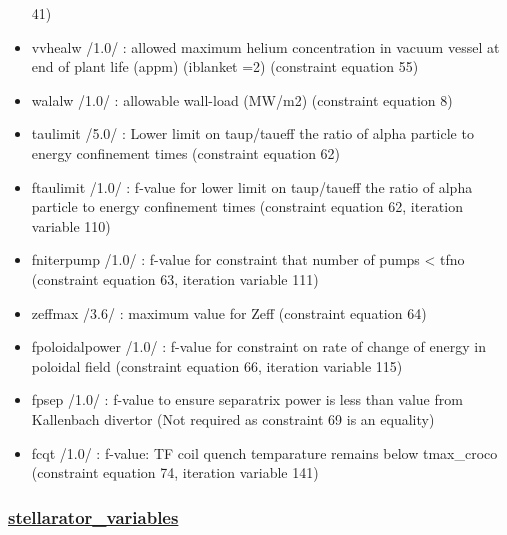 \documentclass[]{article}
\begin{document}
\begin{itemize}
  41)
\item
  vvhealw /1.0/ : allowed maximum helium concentration in vacuum vessel
  at end of plant life (appm) (iblanket =2) (constraint equation 55)
\item
  walalw /1.0/ : allowable wall-load (MW/m2) (constraint equation 8)
\item
  taulimit /5.0/ : Lower limit on taup/taueff the ratio of alpha
  particle to energy confinement times (constraint equation 62)
\item
  ftaulimit /1.0/ : f-value for lower limit on taup/taueff the ratio of
  alpha particle to energy confinement times (constraint equation 62,
  iteration variable 110)
\item
  fniterpump /1.0/ : f-value for constraint that number of pumps
  \textless{} tfno (constraint equation 63, iteration variable 111)
\item
  zeffmax /3.6/ : maximum value for Zeff (constraint equation 64)
\item
  fpoloidalpower /1.0/ : f-value for constraint on rate of change of
  energy in poloidal field (constraint equation 66, iteration variable
  115)
\item
  fpsep /1.0/ : f-value to ensure separatrix power is less than value
  from Kallenbach divertor (Not required as constraint 69 is an
  equality)
\item
  fcqt /1.0/ : f-value: TF coil quench temparature remains below
  tmax\_croco (constraint equation 74, iteration variable 141)
\end{itemize}

\subsubsection{\texorpdfstring{\href{stellarator_variables.html}{stellarator\_variables}}{stellarator\_variables}}\label{stellarator_variables}
\end{document}
